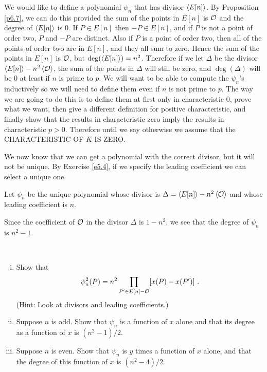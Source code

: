 We would like to define a polynomial $\psi_{n}$ that has divisor $\left\langle E[n] \right \rangle$. By Proposition \ref{p6.7}, we can do this provided the sum of the points in $E[n]$ is $\mathcal{O}$ and the degree of $\left\langle E[n] \right \rangle$ is $0$. If $P\in E[n]$ then $-P\in E[n]$, and if $P$ is not a point of order two, $P$ and $-P$ are distinct. Also if $P$ is a point of order two, then all of the points of order two are in $E[n]$, and they all sum to zero. Hence the sum of the points in $E[n]$ is $\mathcal{O}$, but $\deg(\left\langle E[n] \right \rangle)=n^{2}$. Therefore if we let $\Delta$ be the divisor 
$\left\langle E[n] \right \rangle-n^{2}\left\langle \mathcal{O} \right \rangle$, the sum of the points in $\Delta$ will still be zero, and $\deg(\Delta)$ will be $0$ at least if $n$ is prime to $p$. We will want to be able to compute the $\psi_{n}$'s inductively so we will need to define them even if $n$ is not prime to $p$. The way we are going to do this is to define them at first only in characteristic $0$, prove what we want, then give a different definition for positive characteristic, and finally show that the results in characteristic zero imply the results in characteristic $p>0$. Therefore until we say otherwise we assume that the CHARACTERISTIC OF $K$ IS ZERO.

We now know that we can get a polynomial with the correct divisor, but it will not be unique. By Exercise \ref{e5.4}, if we specify the leading coefficient we can select a unique one.

\begin{defi}
\label{d9.1}
Let $\psi_{n}$ be the unique polynomial whose divisor is $\Delta=\left\langle E[n] \right \rangle-  n^{2}\left\langle \mathcal{O} \right \rangle$ and whose leading coefficient is $n$.
\end{defi}

\rem
Since the coefficient of $\mathcal{O}$ in the divisor $\Delta$ is $1-n^{2}$, we see that the degree of $\psi_{n}$ is $n^{2}-1$.

\begin{exo}
\label{e9.2}
~
\begin{enumerate}[(i)]
\item
Show that
$$
\psi_{n}^{2}(P)=n^{2}\prod_{P'\in E[n]-\mathcal{O}}[x(P)-x(P')]\ .
$$
(Hint: Look at divisors and leading coefficients.)
\item
Suppose $n$ is odd. Show that $\psi_{n}$ is a function of $x$ alone and that its degree as a function of $x$ is $(n^{2}-1)/2$.
\item
Suppose $n$ is even. Show that $\psi_{n}$ is $y$ times a function of $x$ alone, and that the degree of this function of $x$ is $(n^{2}-4)/2$.
\end{enumerate}
\end{exo}

